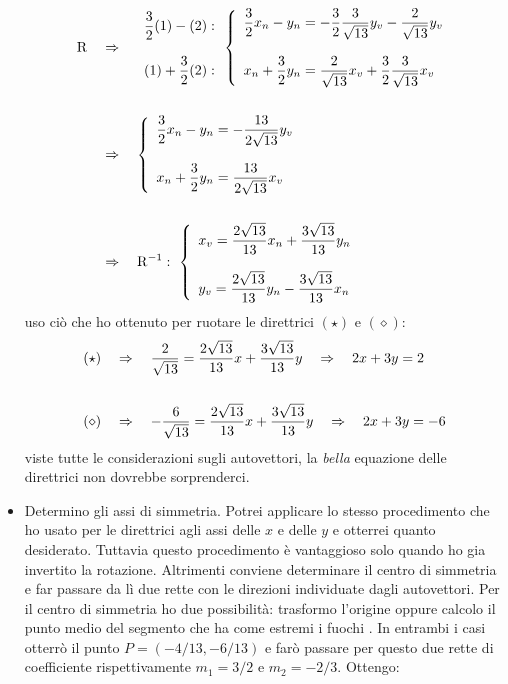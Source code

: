 \documentclass[a4paper, oneside]{article}
\begin{document}
\begin{itemize}
				\begin{align*}
					\mathrm{R} \quad &\Rightarrow \quad 
					\begin{array}{r}
						\displaystyle \frac{3}{2}(1)-(2): \\ \\
						\displaystyle (1)+\frac{3}{2}(2):
					\end{array}
					\left\{
					\begin{array}{l}
						\displaystyle \frac{3}{2}x_n - y_n = -\frac{3}{2}\frac{3}{\sqrt{13}} y_v - \frac{2}{\sqrt{13}} y_v \\ \\
						\displaystyle x_n + \frac{3}{2}y_n = \frac{2}{\sqrt{13}} x_v + \frac{3}{2}\frac{3}{\sqrt{13}} x_v
					\end{array} \right. \\ \\
					\quad &\Rightarrow \quad 
					\left\{
					\begin{array}{l}
						\displaystyle \frac{3}{2}x_n - y_n = -\frac{13}{2\sqrt{13}} y_v \\ \\
						\displaystyle x_n + \frac{3}{2}y_n = \frac{13}{2\sqrt{13}} x_v
					\end{array} \right. \\ \\
					\quad &\Rightarrow \quad 
					\mathrm{R}^{-1}:\ \left\{
					\begin{array}{l}
						\displaystyle x_v = \frac{2\sqrt{13}}{13}x_n + \frac{3\sqrt{13}}{13}y_n \\ \\
						\displaystyle y_v = \frac{2\sqrt{13}}{13}y_n - \frac{3\sqrt{13}}{13}x_n
					\end{array} \right.
				\end{align*}
				uso ciò che ho ottenuto per ruotare le direttrici $(\star)$ e $(\diamond)$:
				\begin{align*}
					(\star) \quad &\Rightarrow \quad \frac{2}{\sqrt{13}}=\frac{2\sqrt{13}}{13}x + \frac{3\sqrt{13}}{13}y \quad \Rightarrow \quad 2x+3y=2 \\ \\
					(\diamond) \quad &\Rightarrow \quad -\frac{6}{\sqrt{13}}=\frac{2\sqrt{13}}{13}x + \frac{3\sqrt{13}}{13}y \quad \Rightarrow \quad 2x+3y=-6
				\end{align*}
				viste tutte le considerazioni sugli autovettori, la \emph{bella} equazione delle direttrici non dovrebbe sorprenderci.
				\item Determino gli assi di simmetria. Potrei applicare lo stesso procedimento che ho usato per le direttrici agli assi delle $x$ e delle $y$ e otterrei quanto desiderato. Tuttavia questo procedimento è vantaggioso solo quando ho gia invertito la rotazione. Altrimenti conviene determinare il centro di simmetria e far passare da lì due rette con le direzioni individuate dagli autovettori. Per il centro di simmetria ho due possibilità: trasformo l'origine oppure calcolo il punto medio del segmento che ha come estremi i fuochi . In entrambi i casi otterrò il punto $P=\left( -4/13, -6/13 \right)$ e farò passare per questo due rette di coefficiente rispettivamente $m_1=3/2$ e $m_2=-2/3$. Ottengo:

\end{itemize}
\end{document}
